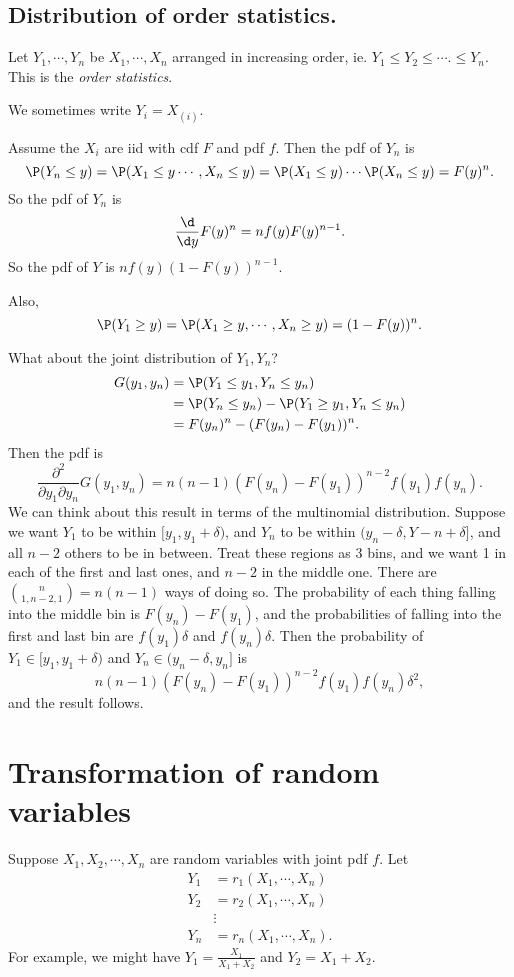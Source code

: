 \documentclass[a4paper]{article}
\begin{document}
\subsection{Distribution of order statistics.}
\begin{defi}
  Let $Y_1, \cdots, Y_n$ be $X_1, \cdots, X_n$ arranged in increasing order, ie. $Y_1 \leq Y_2 \leq \cdots. \leq Y_n$. This is the \emph{order statistics}.

  We sometimes write $Y_i = X_{(i)}$. 
\end{defi}

Assume the $X_i$ are iid with cdf $F$ and pdf $f$. Then the pdf of $Y_n$ is
\[
  \P(Y_n \leq y) = \P(X_1 \leq y \cdots, X_n \leq y) = \P(X_1 \leq y)\cdots\P(X_n \leq y) = F(y)^n.
\]
So the pdf of $Y_n$ is
\[
  \frac{\d }{\d y}F(y)^n = nf(y)F(y)^{n - 1}.
\]
So the pdf of $Y$ is $nf(y)(1 - F(y))^{n - 1}$.

Also,
\[
  \P(Y_1 \geq y) = \P(X_1\geq y, \cdots, X_n \geq y) = (1 - F(y))^n.
\]

What about the joint distribution of $Y_1, Y_n$?
\begin{align*}
  G(y_1, y_n) &= \P(Y_1\leq y_1, Y_n \leq y_n)\\
  &= \P(Y_n \leq y_n) - \P(Y_1 \geq y_1 , Y_n \leq y_n)\\
  &= F(y_n)^n - (F(y_n) - F(y_1))^n.
\end{align*}
Then the pdf is
\[
  \frac{\partial^2}{\partial y_1 \partial y_n}G(y_1, y_n) = n(n - 1)(F(y_n) - F(y_1))^{n - 2}f(y_1)f(y_n).
\]
We can think about this result in terms of the multinomial distribution. Suppose we want $Y_1$ to be within $[y_1, y_1 + \delta)$, and $Y_n$ to be within $(y_n - \delta, Y-n + \delta]$, and all $n - 2$ others to be in between. Treat these regions as 3 bins, and we want 1 in each of the first and last ones, and $n - 2$ in the middle one. There are $\binom{n}{1, n-2, 1} = n(n - 1)$ ways of doing so. The probability of each thing falling into the middle bin is $F(y_n) - F(y_1)$, and the probabilities of falling into the first and last bin are $f(y_1)\delta$ and $f(y_n)\delta$. Then the probability of $Y_1\in [y_1, y_1 + \delta)$ and $Y_n\in (y_n - \delta, y_n]$ is
\[
  n(n - 1)(F(y_n) - F(y_1))^{n - 2} f(y_1)f(y_n)\delta^2,
\]
and the result follows.
\section{Transformation of random variables}
Suppose $X_1, X_2, \cdots, X_n$ are random variables with joint pdf $f$. Let
\begin{align*}
  Y_1 &= r_1(X_1, \cdots, X_n)\\
  Y_2 &= r_2(X_1, \cdots, X_n)\\
  &\vdots \\
  Y_n &= r_n(X_1, \cdots, X_n).
\end{align*}
For example, we might have $Y_1 = \frac{X_1}{X_1 + X_2}$ and $Y_2 = X_1 + X_2$.
\end{document}
